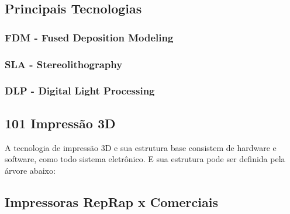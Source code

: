 \subsection{Principais Tecnologias}
\subsubsection{FDM - Fused Deposition Modeling}
\subsubsection{SLA - Stereolithography}
\subsubsection{DLP - Digital Light Processing}

\subsection{101 Impressão 3D}
A tecnologia de impressão 3D e sua estrutura base consistem de hardware e software,
como todo sistema eletrônico. E sua estrutura pode ser definida pela árvore abaixo:
\newline



\subsection{Impressoras RepRap x Comerciais}
